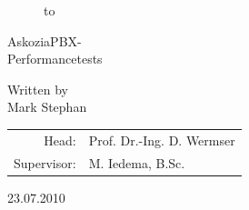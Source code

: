 \begin{titlepage}
\begin{figure}
  \begin{center}
    \hbox to 
  \end{center}
\end{figure}

\begin{center}
\rule{0pt}{0pt}
\vfill
\vfill

\begin{huge}
AskoziaPBX-\\[0.75ex]
Performancetests\\[0.75ex]
\end{huge}

\vfill
\vfill
\vfill
\vfill
Written by\\
\vspace*{.5cm}
Mark Stephan\\
\vspace{.5cm}

\vfill
\vfill
\vfill
\vfill
\vfill
\vfill
\vfill

\begin{tabular}{rl}
Head:    & Prof. Dr.-Ing. D. Wermser\\
Supervisor:   & M. Iedema, B.Sc.\\
\end{tabular}
\end{center}
23.07.2010
\end{titlepage}
